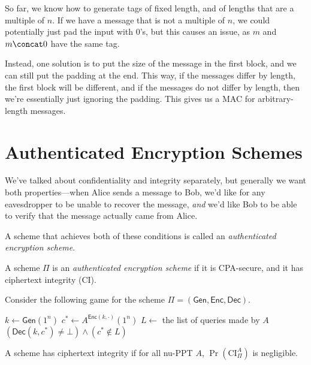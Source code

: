 So far, we know how to generate tags of fixed length, and of lengths that are a multiple of $n$. If we have a message that is not a multiple of $n$, we could potentially just pad the input with 0's, but this causes an issue, as $m$ and $m \concat 0$ have the same tag.

Instead, one solution is to put the size of the message in the first block, and we can still put the padding at the end. This way, if the messages differ by length, the first block will be different, and if the messages do not differ by length, then we're essentially just ignoring the padding. This gives us a MAC for arbitrary-length messages.

\section{Authenticated Encryption Schemes}

We've talked about confidentiality and integrity separately, but generally we want both properties---when Alice sends a message to Bob, we'd like for any eavesdropper to be unable to recover the message, \emph{and} we'd like Bob to be able to verify that the message actually came from Alice.

A scheme that achieves both of these conditions is called an \emph{authenticated encryption scheme}.

\begin{definition}
    A scheme $\Pi$ is an \emph{authenticated encryption scheme} if it is CPA-secure, and it has ciphertext integrity (CI).
\end{definition}

\begin{definition}
    Consider the following game for the scheme $\Pi = (\mathsf{Gen}, \mathsf{Enc}, \mathsf{Dec})$.

    \begin{algorithmic}[1]
            \State $k \gets \mathsf{Gen}(1^n)$
            \State $c^* \gets A^{\mathsf{Enc}(k, \cdot)}(1^n)$
            \State $L \gets$ the list of queries made by $A$
            \State \Return $(\mathsf{Dec}(k, c^*) \ne \bot) \land (c^* \notin L)$
        \EndFunction
    \end{algorithmic}

    A scheme has ciphertext integrity if for all nu-PPT $A$, $\Pr(\mathrm{CI}_{\Pi}^A)$ is negligible.
\end{definition}

